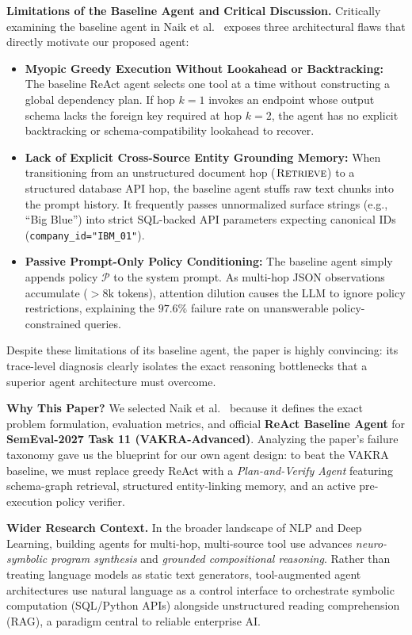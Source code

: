 \documentclass[10pt]{article}
\begin{document}
\textbf{Limitations of the Baseline Agent and Critical Discussion.}
Critically examining the baseline agent in Naik et al.\ \cite{naik2026vakra} exposes three architectural flaws that directly motivate our proposed agent:
\begin{itemize}
    \item \textbf{Myopic Greedy Execution Without Lookahead or Backtracking:} The baseline ReAct agent selects one tool at a time without constructing a global dependency plan. If hop $k=1$ invokes an endpoint whose output schema lacks the foreign key required at hop $k=2$, the agent has no explicit backtracking or schema-compatibility lookahead to recover.
    \item \textbf{Lack of Explicit Cross-Source Entity Grounding Memory:} When transitioning from an unstructured document hop ($\textsc{Retrieve}$) to a structured database API hop, the baseline agent stuffs raw text chunks into the prompt history. It frequently passes unnormalized surface strings (e.g., ``Big Blue'') into strict SQL-backed API parameters expecting canonical IDs (\texttt{company\_id="IBM\_01"}).
    \item \textbf{Passive Prompt-Only Policy Conditioning:} The baseline agent simply appends policy $\mathcal{P}$ to the system prompt. As multi-hop JSON observations accumulate ($>8\text{k}$ tokens), attention dilution causes the LLM to ignore policy restrictions, explaining the $97.6\%$ failure rate on unanswerable policy-constrained queries.
\end{itemize}
Despite these limitations of its baseline agent, the paper is highly convincing: its trace-level diagnosis clearly isolates the exact reasoning bottlenecks that a superior agent architecture must overcome.

\textbf{Why This Paper?}
We selected Naik et al.\ \cite{naik2026vakra} because it defines the exact problem formulation, evaluation metrics, and official \textbf{ReAct Baseline Agent} for \textbf{SemEval-2027 Task 11 (VAKRA-Advanced)}. Analyzing the paper's failure taxonomy gave us the blueprint for our own agent design: to beat the VAKRA baseline, we must replace greedy ReAct with a \textit{Plan-and-Verify Agent} featuring schema-graph retrieval, structured entity-linking memory, and an active pre-execution policy verifier.

\textbf{Wider Research Context.}
In the broader landscape of NLP and Deep Learning, building agents for multi-hop, multi-source tool use advances \textit{neuro-symbolic program synthesis} and \textit{grounded compositional reasoning}. Rather than treating language models as static text generators, tool-augmented agent architectures use natural language as a control interface to orchestrate symbolic computation (SQL/Python APIs) alongside unstructured reading comprehension (RAG), a paradigm central to reliable enterprise AI.
\end{document}
